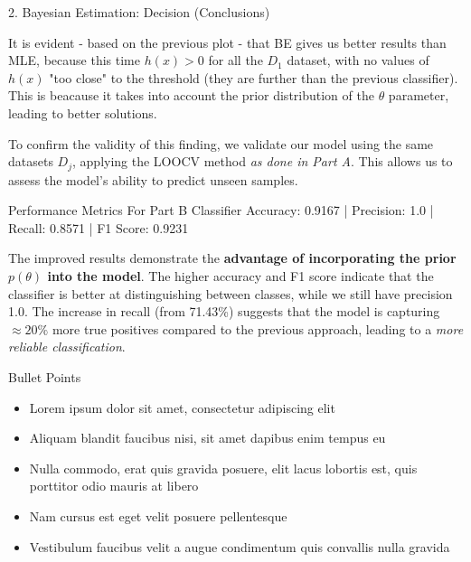 \documentclass[aspectratio=169,xcolor=dvipsnames]{beamer}
\begin{document}
\begin{frame}{2. Bayesian Estimation: Decision (Conclusions)}

    It is evident - based on the previous plot - that BE gives us better results than MLE, because this time $h(x) > 0$ for all the $D_1$ dataset, with no values of $h(x)$ "too close" to the threshold (they are further than the previous classifier). This is beacause it takes into account the prior distribution of the $\theta$ parameter, leading to better solutions.

    \vspace{5pt}

    To confirm the validity of this finding, we validate our model using the same datasets $D_j$, applying the LOOCV method \textit{as done in Part A}. This allows us to assess the model's ability to predict unseen samples. 

    \begin{block}{Performance Metrics For Part B Classifier}
        Accuracy:  0.9167 |
        Precision: 1.0 |
        Recall:    0.8571 |
        F1 Score:  0.9231
    \end{block}

    The improved results demonstrate the \textbf{advantage of incorporating the prior $p(\theta)$ into the model}. The higher accuracy and F1 score indicate that the classifier is better at distinguishing between classes, while we still have precision 1.0. The increase in recall (from 71.43\%) suggests that the model is capturing  $\approx20\%$ more true positives compared to the previous approach, leading to a \textit{more reliable classification}.

\end{frame}


\begin{frame}{Bullet Points}
    \begin{itemize}
        \item Lorem ipsum dolor sit amet, consectetur adipiscing elit
        \item Aliquam blandit faucibus nisi, sit amet dapibus enim tempus eu
        \item Nulla commodo, erat quis gravida posuere, elit lacus lobortis est, quis porttitor odio mauris at libero
        \item Nam cursus est eget velit posuere pellentesque
        \item Vestibulum faucibus velit a augue condimentum quis convallis nulla gravida
    \end{itemize}
\end{frame}
\end{document}
